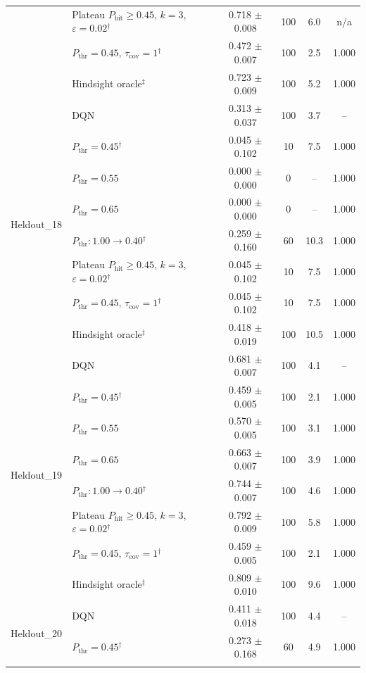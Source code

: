 \begin{table}[htbp]
\begin{tabular}{llcccc}
 & Plateau $P_{\mathrm{hit}}\geq0.45$, $k=3$, $\varepsilon=0.02$$^{\dagger}$ & 0.718 $\pm$ 0.008 & 100 & 6.0 & n/a \\
 & $P_{\mathrm{thr}}=0.45$, $\tau_{\mathrm{cov}}=1$$^{\dagger}$ & 0.472 $\pm$ 0.007 & 100 & 2.5 & 1.000 \\
 & Hindsight oracle$^{\ddagger}$ & 0.723 $\pm$ 0.009 & 100 & 5.2 & 1.000 \\
\midrule
\multirow{8}{*}{Heldout\_18} & DQN & 0.313 $\pm$ 0.037 & 100 & 3.7 & -- \\
 & $P_{\mathrm{thr}}=0.45$$^{\dagger}$ & 0.045 $\pm$ 0.102 & 10 & 7.5 & 1.000 \\
 & $P_{\mathrm{thr}}=0.55$ & 0.000 $\pm$ 0.000 & 0 & -- & 1.000 \\
 & $P_{\mathrm{thr}}=0.65$ & 0.000 $\pm$ 0.000 & 0 & -- & 1.000 \\
 & $P_{\mathrm{thr}}: 1.00 \to 0.40$$^{\dagger}$ & 0.259 $\pm$ 0.160 & 60 & 10.3 & 1.000 \\
 & Plateau $P_{\mathrm{hit}}\geq0.45$, $k=3$, $\varepsilon=0.02$$^{\dagger}$ & 0.045 $\pm$ 0.102 & 10 & 7.5 & 1.000 \\
 & $P_{\mathrm{thr}}=0.45$, $\tau_{\mathrm{cov}}=1$$^{\dagger}$ & 0.045 $\pm$ 0.102 & 10 & 7.5 & 1.000 \\
 & Hindsight oracle$^{\ddagger}$ & 0.418 $\pm$ 0.019 & 100 & 10.5 & 1.000 \\
\midrule
\multirow{8}{*}{Heldout\_19} & DQN & 0.681 $\pm$ 0.007 & 100 & 4.1 & -- \\
 & $P_{\mathrm{thr}}=0.45$$^{\dagger}$ & 0.459 $\pm$ 0.005 & 100 & 2.1 & 1.000 \\
 & $P_{\mathrm{thr}}=0.55$ & 0.570 $\pm$ 0.005 & 100 & 3.1 & 1.000 \\
 & $P_{\mathrm{thr}}=0.65$ & 0.663 $\pm$ 0.007 & 100 & 3.9 & 1.000 \\
 & $P_{\mathrm{thr}}: 1.00 \to 0.40$$^{\dagger}$ & 0.744 $\pm$ 0.007 & 100 & 4.6 & 1.000 \\
 & Plateau $P_{\mathrm{hit}}\geq0.45$, $k=3$, $\varepsilon=0.02$$^{\dagger}$ & 0.792 $\pm$ 0.009 & 100 & 5.8 & 1.000 \\
 & $P_{\mathrm{thr}}=0.45$, $\tau_{\mathrm{cov}}=1$$^{\dagger}$ & 0.459 $\pm$ 0.005 & 100 & 2.1 & 1.000 \\
 & Hindsight oracle$^{\ddagger}$ & 0.809 $\pm$ 0.010 & 100 & 9.6 & 1.000 \\
\midrule
\multirow{8}{*}{Heldout\_20} & DQN & 0.411 $\pm$ 0.018 & 100 & 4.4 & -- \\
 & $P_{\mathrm{thr}}=0.45$$^{\dagger}$ & 0.273 $\pm$ 0.168 & 60 & 4.9 & 1.000 \\
$$
\end{tabular}
\end{table}
